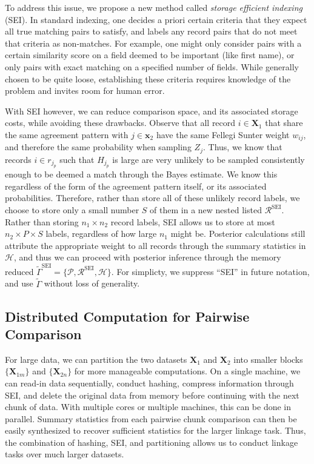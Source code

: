 \documentclass[12pt,letterpaper]{article}
\newcommand{\1}[1]{\mathbb{I}\!\left[#1\right]} %
\begin{document}
To address this issue, we propose a new method called \emph{storage	efficient indexing} (SEI). In standard indexing, one decides a priori certain criteria that they expect all true matching pairs to satisfy, 
and labels any record pairs that do not meet that criteria as
non-matches. For example, one might only consider pairs with a certain
similarity score on a field deemed to be important (like first name), or
only pairs with exact matching on a specified number of fields. While
generally chosen to be quite loose, establishing these criteria
requires knowledge of the problem and invites room for human error. 

With SEI however, we can reduce comparison space, and its associated storage costs, while avoiding these drawbacks. Observe that all record $i \in \bm{X}_1$ that share the same agreement pattern with $j \in \bm{x}_2$ have the same Fellegi Sunter weight $w_{ij}$, and therefore the same probability when sampling \(Z_j\). Thus, we know that records $i \in r_{j_p}$  such that $H_{j_p}$ is large are very unlikely to be sampled consistently enough to be deemed a match through the Bayes estimate. We know this regardless of the form of the agreement pattern itself, or its associated probabilities. Therefore, rather than store all of these unlikely record labels, we choose to store only a small number \(S\) of them in a new nested listed $\mathcal{R}^{\text{SEI}}$. Rather than storing \(n_1 \times n_2\) record labels, SEI allows us to store at most
\(n_2 \times P \times S\) labels, regardless of how large \(n_1\) might be. Posterior calculations still attribute the appropriate weight to all records through the summary statistics in $\mathcal{H}$, and thus we can proceed with posterior inference through the memory reduced $\tilde{\Gamma}^{\text{SEI}} = \{\mathcal{P}, \mathcal{R}^{\text{SEI}}, \mathcal{H}\}$. For simplicty, we suppress ``SEI'' in future notation, and use $\tilde{\Gamma}$ without loss of generality. 

\hypertarget{distributed}{%
	\subsection{Distributed Computation for Pairwise Comparison}\label{distributed}}

For large data, we can partition the two datasets \(\bm{X}_1\) and
\(\bm{X}_2\) into smaller blocks \(\{\bm{X}_{1m}\}\) and \(\{\bm{X}_{2n}\}\) for more
manageable computations. On a single machine, we can read-in data
sequentially, conduct hashing, compress information through SEI, and
delete the original data from memory before continuing with the next
chunk of data. With multiple cores or multiple machines, this can be
done in parallel. Summary statistics from each pairwise chunk comparison can then be easily synthesized to recover sufficient statistics for the larger linkage task.  Thus, the combination of hashing, SEI, and partitioning
allows us to conduct linkage tasks over much larger datasets.
\end{document}
